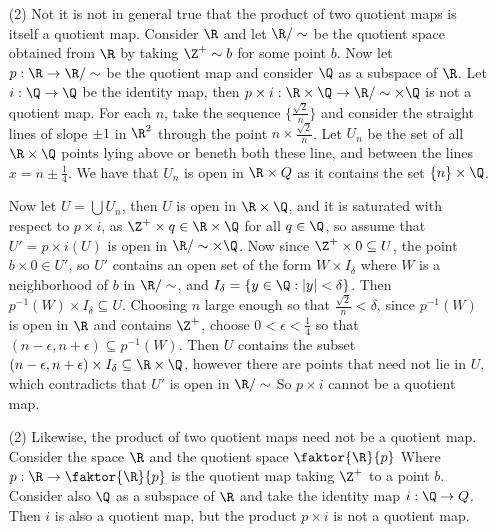\begin{example}
\begin{enumerate}
        \item[(2)] Not it is not in general true that the product of two quotient maps is itself a
            quotient map. Consider $\R$ and let  $\R/\sim$ be the quotient space obtained from  $\R$
            by taking $\Z^+ \sim b$ for some point  $b$. Now let  $p:\R \rightarrow \R/\sim$ be the
            quotient map and consider  $\Q$ as a subspace of  $\R$. Let  $i:\Q \rightarrow \Q$ be
            the identity map, then  $p \times i:\R \times \Q \rightarrow \R/\sim \times \Q$ is not a
            quotient map. For each  $n$, take the sequence  $\{\frac{\sqrt{2}}{n}\}$ and consider
            the straight lines of slope $\pm1$ in $\R^2$ through the point  $n \times
            \frac{\sqrt{2}}{n}$. Let $U_n$ be the set of all  $\R \times \Q$ points lying above or
            beneth both these line, and between the lines  $x=n \pm \frac{1}{4}$. We have that $U_n$
            is open in  $\R \times Q$ as it contains the set  $\{n\} \times \Q$.

            Now let $U=\bigcup{U_n}$, then $U$ is open in  $\R \times \Q$, and it is saturated with
            respect to  $p \times i$, as  $\Z^+ \times q \in \R \times \Q$ for all  $q \in \Q$, so
            assume that  $U'=p \times i(U)$ is open in $\R/\sim \times \Q$. Now since  $\Z^+ \times
            0 \subseteq U$, the point  $b \times 0 \in U'$, so  $U'$ contains an open set of the
            form  $W \times I_{\delta}$ where $W$ is a neighborhood of  $b$ in  $\R/\sim$, and
            $I_{\delta}=\{y \in \Q:|y|<\delta\}$. Then $p^{-1}(W) \times I_{\delta} \subseteq U$.
            Choosing $n$ large enough so that  $ \frac{\sqrt{2}}{n}<\delta$, since $p^{-1}(W)$ is
            open in $\R$ and contains  $\Z^+$, choose  $0<\epsilon<\frac{1}{4}$ so that
            $(n-\epsilon,n+\epsilon) \subseteq p^{-1}(W)$. Then $U$ contains the subset
            $(n-\epsilon,n+\epsilon) \times I_{\delta} \subseteq \R \times \Q$, however there are
            points that need not lie in $U$, which contradicts that  $U'$ is open in $\R/\sim$ So
            $p \times i$ cannot be a quotient map.

        \item[(2)] Likewise, the product of two quotient maps need not be a
            quotient map. Consider the space $\R$ and the quotient space
            $\faktor{\R}{p}$ Where $p:\R \rightarrow \faktor{\R}{p}$ is the
            quotient map taking $\Z^+$ to a point  $b$. Consider also  $\Q$ as a
            subspace of  $\R$ and take the identity map  $i:\Q \rightarrow Q$.
            Then $i$ is also a quotient map, but the product  $p \times i$ is
            not a quotient map.


\end{enumerate}
\end{example}
